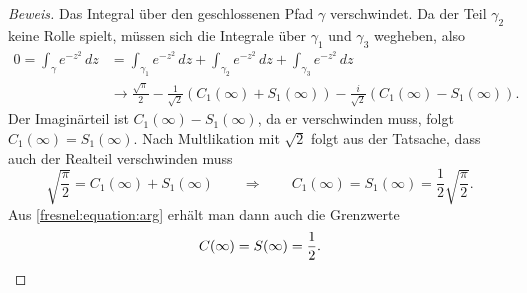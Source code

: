 \begin{proof}[Beweis]
Das Integral über den geschlossenen Pfad $\gamma$ verschwindet.
Da der Teil $\gamma_2$ keine Rolle spielt, müssen sich die
Integrale über $\gamma_1$ und $\gamma_3$ wegheben, also
\begin{align*}
0
=
\int_\gamma e^{-z^2}\,dz
&=
\int_{\gamma_1} e^{-z^2}\,dz
+
\int_{\gamma_2} e^{-z^2}\,dz
+
\int_{\gamma_3} e^{-z^2}\,dz
\\
&\to
\frac{\sqrt{\pi}}2
-\frac{1}{\sqrt{2}}(C_1(\infty)+S_1(\infty))
-\frac{i}{\sqrt{2}}(C_1(\infty)-S_1(\infty)).
\end{align*}
Der Imaginärteil ist $C_1(\infty)-S_1(\infty)$, da er verschwinden
muss, folgt $C_1(\infty)=S_1(\infty)$.
Nach Multlikation mit $\sqrt{2}$ folgt aus der Tatsache, dass auch
der Realteil verschwinden muss
\[
\sqrt{\frac{\pi}{2}} = C_1(\infty)+S_1(\infty)
\qquad
\Rightarrow
\qquad
C_1(\infty)
=
S_1(\infty)
=
\frac12
\sqrt{
\frac{\pi}{2}
}.
\]
Aus
\eqref{fresnel:equation:arg}
erhält man dann auch die Grenzwerte
\[
C(\infty)=S(\infty)=\frac12.
\qedhere
\]
\end{proof}
